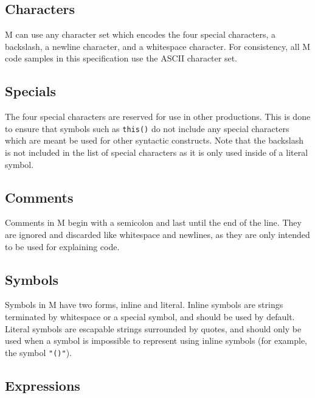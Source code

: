 \documentclass{article}
\begin{document}
    \begin{multicols}{2}
        \subsection{Characters}\label{subsec:characters}

        M can use any character set which encodes the four special characters, a backslash, a newline character, and a whitespace character.
        For consistency, all M code samples in this specification use the ASCII character set.

        \subsection{Specials}\label{subsec:specials}

        The four special characters are reserved for use in other productions.
        This is done to ensure that symbols such as \lstinline$this()$ do not include any special characters which are meant be used for other syntactic constructs.
        Note that the backslash is not included in the list of special characters as it is only used inside of a literal symbol.

        \subsection{Comments}\label{subsec:comments}

        Comments in M begin with a semicolon and last until the end of the line.
        They are ignored and discarded like whitespace and newlines, as they are only intended to be used for explaining code.

        \subsection{Symbols}\label{subsec:symbols}

        Symbols in M have two forms, inline and literal.
        Inline symbols are strings terminated by whitespace or a special symbol, and should be used by default.
        Literal symbols are escapable strings surrounded by quotes, and should only be used when a symbol is impossible to represent using inline symbols (for example, the symbol \lstinline$"()"$).

        \subsection{Expressions}\label{subsec:expressions}


\end{multicols}
\end{document}
